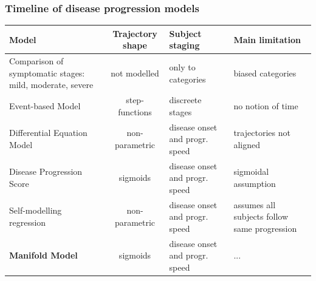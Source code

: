 \documentclass[10pt,xcolor=table]{beamer}
\begin{document}
\begin{frame}
\frametitle{Timeline of disease progression models}

\newcommand{\colWidth}{2.7}

\begin{table}
\scriptsize


\centering

\begin{tabular}{p{2.5 cm} | c | p{2 cm} | p{\colWidth cm}}

 Model & Trajectory shape & Subject staging & Main limitation \\
 \hline
 Comparison of symptomatic stages: mild, moderate, severe & \textcolor{orange0}{not modelled} & \textcolor{orange0}{only to categories} & biased categories\\
  \hline
 Event-based Model & \textcolor{orange1}{step-functions} & \textcolor{orange1}{discreete stages} & no notion of time\\
  \hline
 Differential Equation Model & \textcolor{orange3}{non-parametric} & \textcolor{orange3}{disease onset and progr. speed} & trajectories not aligned\\
  \hline
 Disease Progression Score & \textcolor{orange2}{sigmoids} & \textcolor{orange3}{disease onset and progr. speed} & sigmoidal assumption\\
  \hline
 Self-modelling regression & \textcolor{orange3}{non-parametric} & \textcolor{orange3}{disease onset and progr. speed} & assumes all subjects follow same progression\\
  \hline
 \textbf{Manifold Model} & \textcolor{orange2}{sigmoids} & \textcolor{orange3}{disease onset and progr. speed} & ...\\
\end{tabular}
\end{table}




\end{frame}
\end{document}
